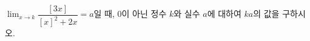 $\displaystyle\lim_{x\to k}\dfrac{[3x]}{[x]^2+2x}=a$일 때, $0$이 아닌 정수 $k$와 실수 $a$에 대하여 $ka$의 값을 구하시오. 
